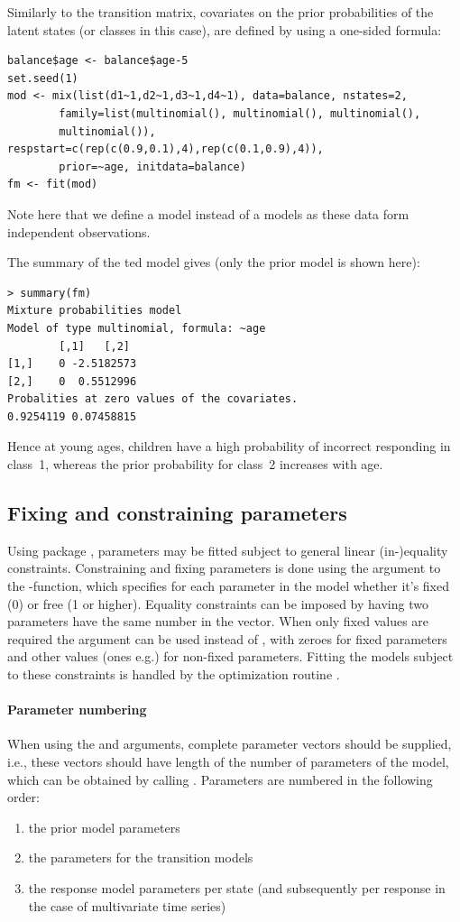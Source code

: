 \documentclass[article]{jss}
\begin{document}
Similarly to the transition matrix, covariates on the prior 
probabilities of the latent states (or classes in this case), are 
defined by using a one-sided formula: 
\begin{verbatim}
balance$age <- balance$age-5
set.seed(1)
mod <- mix(list(d1~1,d2~1,d3~1,d4~1), data=balance, nstates=2,
        family=list(multinomial(), multinomial(), multinomial(),
		multinomial()), respstart=c(rep(c(0.9,0.1),4),rep(c(0.1,0.9),4)), 
		prior=~age, initdata=balance)
fm <- fit(mod)
\end{verbatim}
Note here that we define a  model instead of a 
models as these data form independent observations.

The summary of the ted model gives (only the prior model is 
shown here): 
\begin{verbatim}
> summary(fm)
Mixture probabilities model 
Model of type multinomial, formula: ~age
		[,1]   [,2]
[1,]    0 -2.5182573
[2,]    0  0.5512996
Probalities at zero values of the covariates.
0.9254119 0.07458815 
\end{verbatim}	
Hence at young ages, children have a high probability of incorrect 
responding in class~1, whereas the prior probability for class~2 
increases with age. 


\subsection{Fixing and constraining parameters}

Using package , parameters may be fitted subject to
general linear (in-)equality constraints.  Constraining and fixing
parameters is done using the  argument to the
-function, which specifies for each parameter in the
model whether it's fixed (0) or free (1 or higher).  Equality
constraints can be imposed by having two parameters have the same
number in the  vector.  When only fixed values are
required the  argument can be used instead of
, with zeroes for fixed parameters and other values (ones
e.g.) for non-fixed parameters.  Fitting the models subject to these
constraints is handled by the optimization routine .

\paragraph{Parameter numbering} When using the  and
 arguments, complete parameter vectors should be supplied,
i.e., these vectors should have length of the number of parameters of
the model, which can be obtained by calling .
Parameters are numbered in the following order:
\begin{enumerate}
	\item  the prior model parameters
	\item  the parameters for the transition models
	\item  the response model parameters per state (and subsequently
	per response in the case of multivariate time series)
\end{enumerate}
\end{document}
